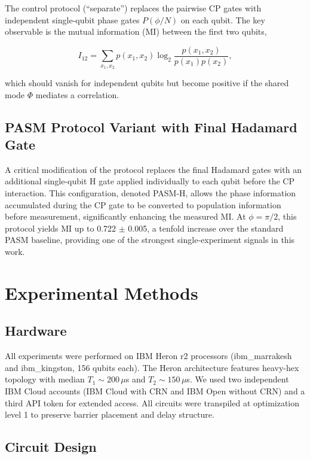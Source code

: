 ﻿\documentclass[12pt,a4paper]{article}
\begin{document}
The control protocol (``separate'') replaces the pairwise CP gates with independent single-qubit phase gates $P(\phi/N)$ on each qubit. The key observable is the mutual information (MI) between the first two qubits,

\begin{equation}
I_{12} = \sum_{x_1,x_2} p(x_1,x_2) \log_2 \frac{p(x_1,x_2)}{p(x_1)p(x_2)},
\end{equation}

which should vanish for independent qubits but become positive if the shared mode $\Phi$ mediates a correlation.

\subsection{PASM Protocol Variant with Final Hadamard Gate}

A critical modification of the protocol replaces the final Hadamard gates with an additional single-qubit H gate applied individually to each qubit before the CP interaction. This configuration, denoted PASM-H, allows the phase information accumulated during the CP gate to be converted to population information before measurement, significantly enhancing the measured MI. At $\phi = \pi/2$, this protocol yields MI up to 0.722 $\pm$ 0.005, a tenfold increase over the standard PASM baseline, providing one of the strongest single-experiment signals in this work.

\section{Experimental Methods}
\label{sec:methods}

\subsection{Hardware}

All experiments were performed on IBM Heron r2 processors (ibm\_marrakesh and ibm\_kingston, 156 qubits each). The Heron architecture features heavy-hex topology with median $T_1 \sim 200\,\mu$s and $T_2 \sim 150\,\mu$s. We used two independent IBM Cloud accounts (IBM Cloud with CRN and IBM Open without CRN) and a third API token for extended access. All circuits were transpiled at optimization level 1 to preserve barrier placement and delay structure.

\subsection{Circuit Design}
\end{document}

